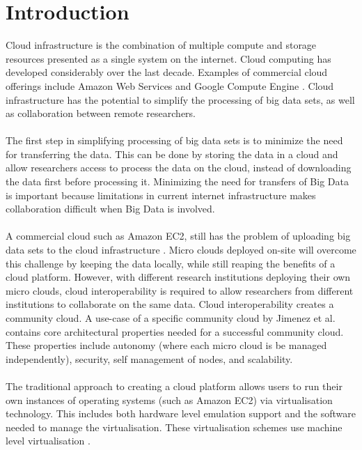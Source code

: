 \documentclass{sig-alternate-05-2015}
\begin{document}
\section{Introduction}
Cloud infrastructure is the combination of multiple compute and storage resources presented as a single system on the internet. Cloud computing has developed considerably over the last decade. Examples of commercial cloud offerings include Amazon Web Services and Google Compute Engine \cite{krishnan2015google, mathew2014overview}. Cloud infrastructure has the potential to simplify the processing of big data sets, as well as collaboration between remote researchers. 
\\
\\
The first step in simplifying processing of big data sets is to minimize the need for transferring the data. This can be done by storing the data in a cloud and allow researchers access to process the data on the cloud, instead of downloading the data first before processing it. Minimizing the need for transfers of Big Data is important because limitations in current internet infrastructure makes collaboration difficult when Big Data is involved. 
\\
\\
A commercial cloud such as Amazon EC2, still has the problem of uploading big data sets to the cloud infrastructure \cite{baker2010next}. Micro clouds deployed on-site will overcome this challenge by keeping the data locally, while still reaping the benefits of a cloud platform. However, with different research institutions deploying their own micro clouds, cloud interoperability is required to allow researchers from different institutions to collaborate on the same data. Cloud interoperability creates a community cloud. A use-case of a specific community cloud  by Jimenez et al. \cite{jimenez2014deploying} contains core architectural properties needed for a successful community cloud. These properties include autonomy (where each micro cloud is be managed independently), security, self management of nodes, and scalability.
\\
\\
The traditional approach to creating a cloud platform allows users to run their own instances of operating systems (such as Amazon EC2) via virtualisation technology. This includes both hardware level emulation support and the software needed to manage the virtualisation. These virtualisation schemes use machine level virtualisation \cite{fink2014docker}. \\\\
\end{document}
